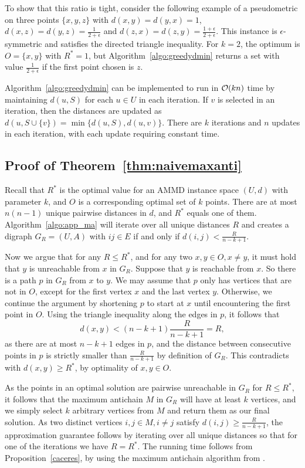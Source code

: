 To show that this ratio is tight, consider the following example of a pseudometric on three points $\{x,y,z\}$ with $d(x,y) = d(y,x) = 1$,
$d(x,z) = d(y,z) = \frac{1}{2+\epsilon}$ and 
$d(z,x) = d(z,y) = \frac{1+\epsilon}{2+\epsilon}$. This instance is $\epsilon$-symmetric and satisfies the directed triangle inequality. For $k=2$, the optimum is $O=\{x,y\}$ with $R^*=1$, but Algorithm~\ref{algo:greedydmin} returns a set with value $\frac{1}{2+\epsilon}$ if the first point chosen is $z$.

Algorithm~\ref{algo:greedydmin} can be implemented to run in $\mathcal{O}(kn)$ time by maintaining $d(u,S)$ for each $u \in U$ in each iteration. If $v$ is selected in an iteration, then the distances are updated as $d(u,S \cup \{v\}) = \min\{d(u,S),d(u,v)\}$. There are $k$ iterations and $n$ updates in each iteration, with each update requiring constant time.


\subsection{Proof of Theorem~\ref{thm:naivemaxanti}}
Recall that $R^*$ is the optimal value for an AMMD instance space $(U,d)$ with parameter $k$, and $O$ is a corresponding optimal set of $k$ points.
There are at most $n(n-1)$ unique pairwise distances in $d$, and $R^*$ equals one of them. Algorithm~\ref{algo:app_ma} will iterate over all unique distances $R$ and creates a digraph $G_R = (U,A)$ with $ij \in E$ if and only if $d(i,j)< \frac{R}{n-k+1}$. 

Now we argue that for any $R \leq R^*$, and for any two $x, y \in O, x \neq y$, it must hold that $y$ is unreachable from $x$ in $G_R$.
Suppose that $y$ is reachable from $x$. So there is a path $p$ in $G_R$ from $x$ to $y$.
We may assume that $p$ only has vertices that are not in $O$, except for the first vertex $x$ and the last vertex $y$. Otherwise, we continue the argument by shortening $p$ to start at $x$ until encountering the first point in $O$. Using the triangle inequality along the edges in $p$, it follows that
\[
	d(x,y) < (n-k+1) \frac{R}{n-k+1} = R,
\]
as there are at most $n-k+1$ edges in $p$, and the distance between consecutive points in $p$ is strictly smaller than $\frac{R}{n-k+1}$ by definition of $G_R$. This contradicts with $d(x,y) \geq R^*$, by optimality of $x, y \in O$.

As the points in an optimal solution are pairwise unreachable in $G_R$ for $R \leq R^*$, it follows that the maximum antichain $M$ in $G_R$ will have at least $k$ vertices, and we simply select $k$ arbitrary vertices from $M$ and return them as our final solution. As two distinct vertices $i, j \in M, i \neq j$ satisfy $d(i,j) \geq \frac{R}{n-k+1}$, the approximation guarantee follows by iterating over all unique distances so that for one of the iterations we have $R=R^*$.
The running time follows from Proposition~\ref{caceres}, by using the maximum antichain algorithm from \cite{caceres2022minimum}.

